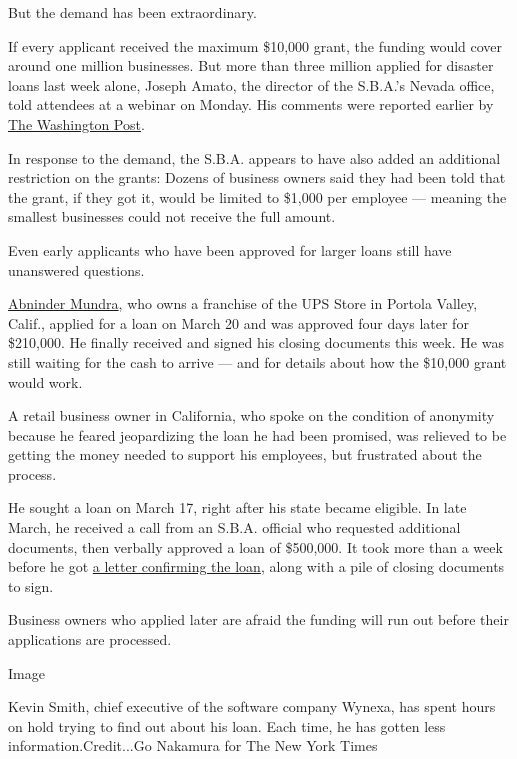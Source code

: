 But the demand has been extraordinary.

If every applicant received the maximum \$10,000 grant, the funding
would cover around one million businesses. But more than three million
applied for disaster loans last week alone, Joseph Amato, the director
of the S.B.A.'s Nevada office, told attendees at a webinar on Monday.
His comments were reported earlier by
\href{https://www.washingtonpost.com/business/2020/04/08/video-sba-official-blasts-big-banks-over-failure-quickly-distribute-loans/}{The
Washington Post}.

In response to the demand, the S.B.A. appears to have also added an
additional restriction on the grants: Dozens of business owners said
they had been told that the grant, if they got it, would be limited to
\$1,000 per employee --- meaning the smallest businesses could not
receive the full amount.

Even early applicants who have been approved for larger loans still have
unanswered questions.

\href{https://www.nytimes.com/2020/04/02/business/small-business-coronavirus-stimulus.html}{Abninder
Mundra}, who owns a franchise of the UPS Store in Portola Valley,
Calif., applied for a loan on March 20 and was approved four days later
for \$210,000. He finally received and signed his closing documents this
week. He was still waiting for the cash to arrive --- and for details
about how the \$10,000 grant would work.

A retail business owner in California, who spoke on the condition of
anonymity because he feared jeopardizing the loan he had been promised,
was relieved to be getting the money needed to support his employees,
but frustrated about the process.

He sought a loan on March 17, right after his state became eligible. In
late March, he received a call from an S.B.A. official who requested
additional documents, then verbally approved a loan of \$500,000. It
took more than a week before he got
\href{https://int.nyt.com/data/documenthelper/6870-sba-eidl-loan-approval-letter/optimized/full.pdf}{a
letter confirming the loan}, along with a pile of closing documents to
sign.

Business owners who applied later are afraid the funding will run out
before their applications are processed.

Image

Kevin Smith, chief executive of the software company Wynexa, has spent
hours on hold trying to find out about his loan. Each time, he has
gotten less information.Credit...Go Nakamura for The New York Times

